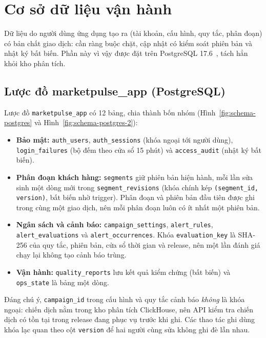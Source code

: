 \section{Cơ sở dữ liệu vận hành}
\label{sec:c4-csdl-van-hanh}

Dữ liệu do người dùng ứng dụng tạo ra (tài khoản, cấu hình, quy tắc, phân đoạn) có bản chất giao dịch: cần ràng buộc chặt, cập nhật có kiểm soát phiên bản và nhật ký bất biến. Phần này vì vậy được đặt trên PostgreSQL 17.6~\cite{postgresdocs}, tách hẳn khỏi kho phân tích.

\subsection{Lược đồ marketpulse\_app (PostgreSQL)}
\label{sec:c4-pg-app}
Lược đồ \texttt{marketpulse\_app} có 12 bảng, chia thành bốn nhóm (Hình~\ref{fig:schema-postgres} và Hình~\ref{fig:schema-postgres-2}):

\begin{itemize}
    \item \textbf{Bảo mật:} \texttt{auth\_users}, \texttt{auth\_sessions} (khóa ngoại tới người dùng), \texttt{login\_failures} (bộ đếm theo cửa sổ 15 phút) và \texttt{access\_audit} (nhật ký bất biến).
    \item \textbf{Phân đoạn khách hàng:} \texttt{segments} giữ phiên bản hiện hành, mỗi lần sửa sinh một dòng mới trong \texttt{segment\_revisions} (khóa chính kép \texttt{(segment\_id, version)}, bất biến nhờ trigger). Phân đoạn và phiên bản đầu tiên được ghi trong cùng một giao dịch, nên mỗi phân đoạn luôn có ít nhất một phiên bản.
    \item \textbf{Ngân sách và cảnh báo:} \texttt{campaign\_settings}, \texttt{alert\_rules}, \texttt{alert\_evaluations} và \texttt{alert\_occurrences}. Khóa \texttt{evaluation\_key} là SHA-256 của quy tắc, phiên bản, cửa sổ thời gian và release, nên một lần đánh giá chạy lại không tạo cảnh báo trùng.
    \item \textbf{Vận hành:} \texttt{quality\_reports} lưu kết quả kiểm chứng (bất biến) và \texttt{ops\_state} là bảng một dòng.
\end{itemize}

Đáng chú ý, \texttt{campaign\_id} trong cấu hình và quy tắc cảnh báo \emph{không} là khóa ngoại: chiến dịch nằm trong kho phân tích ClickHouse, nên API kiểm tra chiến dịch có tồn tại trong release đang phục vụ trước khi ghi. Các thao tác ghi dùng khóa lạc quan theo cột \texttt{version} để hai người cùng sửa không ghi đè lẫn nhau.

